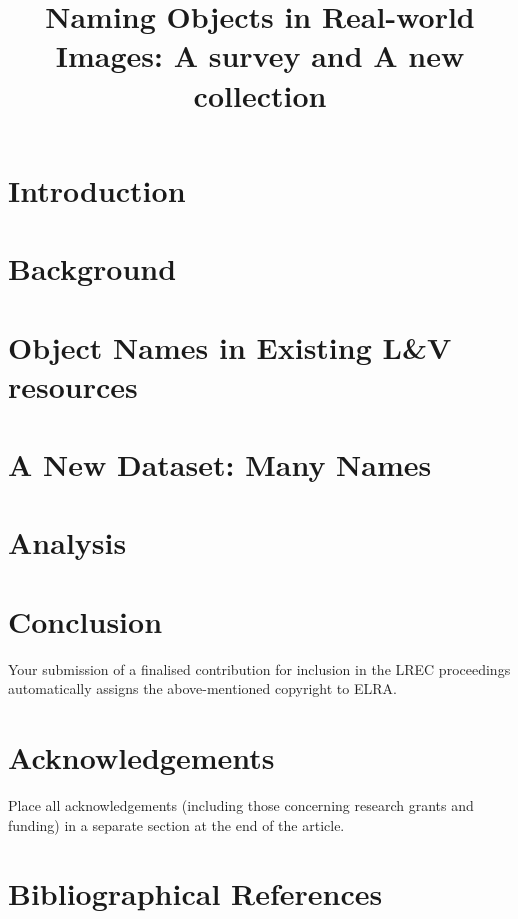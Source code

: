 \documentclass[10pt, a4paper]{article}
\title{Naming Objects in Real-world Images: A survey and A new \sz{linguistically motivated????} collection}
\begin{document}
\maketitleabstract

\section{Introduction}


\section{Background}


\section{Object Names in Existing L\&V resources}


\section{A New Dataset: Many Names}
\label{sec:data}

	
\section{Analysis}
\label{sec:analysis}


\section{Conclusion}

Your submission of a finalised contribution for inclusion in the LREC
proceedings automatically assigns the above-mentioned copyright to ELRA.


\section{Acknowledgements}

Place all acknowledgements (including those concerning research grants and
funding) in a separate section at the end of the article.

\section{Bibliographical References}
\label{main:ref}





\end{document}
